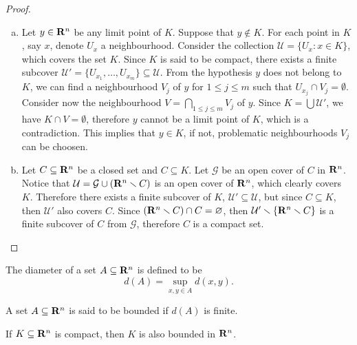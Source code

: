 \begin{proof}
\begin{enumerate}[(a)]
\item Let \(y \in \mathbf{R}^n\) be any limit point of \(K\). Suppose that \(y
    \not\in K\). For each point in \(K\), say \(x\), denote \(U_x\) a
    neighbourhood. Consider the collection \(\mathcal U = \{U_x \colon x \in K\}\),
    which covers the set \(K\). Since \(K\) is said to be compact, there
    exists a finite subcover \(\mathcal U' = \{U_{x_1}, \dots, U_{x_m}\}
    \subseteq \mathcal U\). From the hypothesis \(y\) does not belong to
    \(K\), we can find a neighbourhood \(V_j\) of \(y\) for \(1 \leq j \leq
    m\) such that \(U_{x_j} \cap V_j = \emptyset\). Consider now the
    neighbourhood \(V = \bigcap_{1 \leq j \leq m} V_j\) of \(y\). Since \(K =
    \bigcup \mathcal U'\), we have \(K \cap V = \emptyset\), therefore \(y\)
    cannot be a limit point of \(K\), which is a contradiction. This implies
    that \(y \in K\), if not, problematic neighbourhoods \(V_j\) can be
    choosen.
\item Let \(C \subseteq \mathbf{R}^n\) be a closed set and \(C \subseteq K\). Let
    \(\mathcal G\) be an open cover of \(C\) in \(\mathbf{R}^n\). Notice that
    \(\mathcal U = \mathcal G \cup (\mathbf{R}^n \smallsetminus C)\) is an open cover of
    \(\mathbf{R}^n\), which clearly covers \(K\). Therefore there exists a finite
    subcover of \(K\), \(\mathcal U' \subseteq \mathcal U\), but since \(C
    \subseteq K\), then \(\mathcal U'\) also covers \(C\). Since \((\mathbf{R}^n
    \smallsetminus C) \cap C = \varnothing\), then \(\mathcal U' \smallsetminus \{\mathbf{R}^n
    \smallsetminus C\}\) is a finite subcover of \(C\) from \(\mathcal G\),
    therefore \(C\) is a compact set.
\end{enumerate}
\end{proof}

\begin{definition}\label{def:Rn-diameter}
The diameter of a set \(A \subseteq \mathbf{R}^n\) is defined to be
\[
d(A) = \sup_{x, y \in A} d(x, y).
\]
\end{definition}

\begin{definition}\label{def: bounded}
A set \(A \subseteq \mathbf{R}^n\) is said to be bounded if \(d(A)\) is finite.
\end{definition}

\begin{proposition}\label{prop: compact then bounded}
If \(K \subseteq \mathbf{R}^n\) is compact, then \(K\) is also bounded in \(\mathbf{R}^n\).
\end{proposition}

